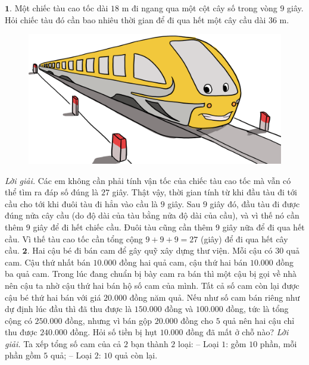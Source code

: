 \begin{multicols}{2}
	$\pmb{1.}$ Một chiếc tàu cao tốc dài $18$ m đi ngang qua một cột cây số trong vòng $9$ giây. Hỏi chiếc tàu đó cần bao nhiêu thời gian để đi qua hết một cây cầu dài $36$ m. 
	\begin{figure}[H]
		\centering
		\vspace*{-10pt}
		\captionsetup{labelformat= empty, justification=centering}
		\includegraphics[width=1\linewidth]{Pi10_ToanBi_Bai1}
		\vspace*{-15pt}
	\end{figure}
	\textit{Lời giải.} 	Các em không cần phải tính vận tốc của chiếc tàu cao tốc mà vẫn có thể tìm ra đáp số đúng là $27$ giây. Thật vậy, thời gian tính từ khi đầu tàu đi tới cầu cho tới khi đuôi tàu đi hẳn vào cầu là $9$ giây. Sau $9$ giây đó, đầu tàu đi được đúng nửa cây cầu (do độ dài của tàu bằng nửa độ dài của cầu), và vì thế nó cần thêm $9$ giây để đi hết chiếc cầu. Đuôi tàu cũng cần thêm $9$ giây nữa để đi qua hết cầu. Vì thế tàu cao tốc cần tổng cộng $9+9+9= 27$ (giây) để đi qua hết cây cầu.
	\vskip 0.1cm
	$\pmb{2.}$ Hai cậu bé đi bán cam để gây quỹ xây dựng thư viện. Mỗi cậu có $30$ quả cam. Cậu thứ nhất bán  $10{.}000$ đồng hai quả cam, cậu thứ hai bán $10{.}000$ đồng ba quả cam. Trong lúc đang chuẩn bị bày cam ra bán thì một cậu bị gọi về nhà nên cậu ta nhờ cậu thứ hai bán hộ số cam của mình. Tất cả số cam còn lại được cậu bé thứ hai bán với giá $20{.}000$ đồng năm quả. Nếu như số cam bán riêng như dự định lúc đầu thì đã thu được là $150{.}000$ đồng và $100{.}000$ đồng, tức là tổng cộng có $250{.}000$ đồng, nhưng vì bán gộp $20{.}000$ đồng cho $5$ quả nên  hai cậu chỉ thu được $240{.}000$ đồng. Hỏi số tiền bị hụt $10{.}000$ đồng đã mất ở chỗ nào?
	\vskip 0.1cm
	\textit{Lời giải.} Ta xếp tổng số cam của cả $2$ bạn thành $2$ loại:
	\vskip 0.1cm
	-- Loại $1$: gồm $10$ phần, mỗi phần gồm $5$ quả;
	\vskip 0.1cm
	-- Loại $2$: $10$ quả còn lại.

\end{multicols}
